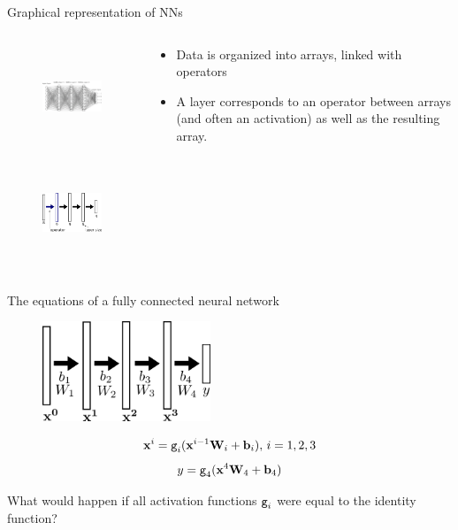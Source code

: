 \documentclass[xcolor=pdftex,dvipsnames,table,mathserif]{beamer}
\begin{document}
\begin{frame}{Graphical representation of NNs}

\begin{columns}
  \begin{column}{.5\textwidth}
    \begin{figure}
      \includegraphics[height=3cm]{network.png}
    \end{figure}
    \begin{figure}
      \includegraphics[height=3cm]{nn_representation}
    \end{figure}
  \end{column}

  \begin{column}{.5\textwidth}
    \begin{itemize}
    \item Data is organized into arrays, linked with operators
    \item A layer corresponds to an operator between arrays (and often an activation) as well as the resulting array.
    \end{itemize}
  \end{column}
\end{columns}


\end{frame}


\begin{frame}{The equations of a fully connected neural network}

    \begin{figure}
      \includegraphics[height=3cm]{nn_representation2}
    \end{figure}

    \begin{block}{}
      \[\mathbf{x}^i = \texttt{g}_i(\mathbf{x}^{i-1}\mathbf{W}_i + \mathbf{b}_i),\, i= 1, 2, 3 \]
      \[y = \texttt{g}_4(\mathbf{x}^4\mathbf{W}_4 + \mathbf{b}_4)\]
    \end{block}

    \pause

    What would happen if all activation functions $\texttt{g}_i$ were equal to the identity function?

\end{frame}
\end{document}
